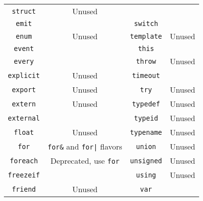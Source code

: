 \begin{table}[\floatpos]
\begin{tabular}{|c|c||c|c|}
    \lstinline"struct"            & Unused                                  \\
    \lstinline"emit"              &                                         &
    \lstinline"switch"            &                                         \\
    \lstinline"enum"              & Unused                                  &
    \lstinline"template"          & Unused                                  \\
    \lstinline"event"             &                                         &
    \lstinline"this"              &                                         \\
    \lstinline"every"             &                                         &
    \lstinline"throw"             & Unused                                  \\
    \lstinline"explicit"          & Unused                                  &
    \lstinline"timeout"           &                                         \\
    \lstinline"export"            & Unused                                  &
    \lstinline"try"               & Unused                                  \\
    \lstinline"extern"            & Unused                                  &
    \lstinline"typedef"           & Unused                                  \\
    \lstinline"external"          &                                         &
    \lstinline"typeid"            & Unused                                  \\
    \lstinline"float"             & Unused                                  &
    \lstinline"typename"          & Unused                                  \\
    \lstinline"for"               & \lstinline|for&| and \lstinline-for|- flavors&
    \lstinline"union"             & Unused                                  \\
    \lstinline"foreach"           & Deprecated, use \lstinline|for|    &
    \lstinline"unsigned"          & Unused                                  \\
    \lstinline"freezeif"          &                                         &
    \lstinline"using"             & Unused                                  \\
    \lstinline"friend"            & Unused                                  &
    \lstinline"var"               &                                         \\

\end{tabular}
\end{table}
